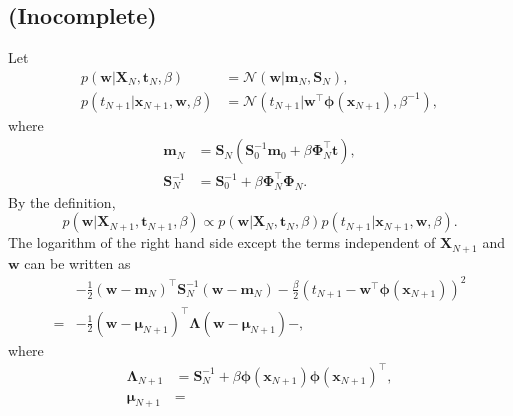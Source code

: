 \subsection{(Inocomplete)}
\label{3.8}
Let
%
\begin{equation}
\begin{aligned}
p(\mathbf{w} | \mathbf{X}_N, \mathbf{t}_N, \beta)
&=
\mathcal{N}
(\mathbf{w} | \mathbf{m}_N, \mathbf{S}_N),
\\
p(t_{N + 1} | \mathbf{x}_{N + 1}, \mathbf{w}, \beta)
&=
\mathcal{N}
\left(
	t_{N + 1}
	|
	\mathbf{w} ^ \intercal
	\bm{\phi}(\mathbf{x}_{N + 1}),
	\beta ^ {- 1}
\right),
\end{aligned}
\end{equation}
%
where
%
\begin{equation}
\begin{aligned}
\mathbf{m}_N
&=
\mathbf{S}_N
\left(
	\mathbf{S}_0 ^ {- 1}
	\mathbf{m}_0
	+
	\beta
	\bm{\Phi}_N ^ \intercal
	\mathbf{t}
\right),
\\
\mathbf{S}_N ^ {- 1}
&=
\mathbf{S}_0 ^ {- 1}
+
\beta
\bm{\Phi}_N ^ \intercal
\bm{\Phi}_N.
\end{aligned}
\end{equation}
%
By the definition,
%
\begin{equation}
p(\mathbf{w} | \mathbf{X}_{N + 1}, \mathbf{t}_{N + 1}, \beta)
\propto
p(\mathbf{w} | \mathbf{X}_N, \mathbf{t}_N, \beta)
p(t_{N + 1} | \mathbf{x}_{N + 1}, \mathbf{w}, \beta).
\end{equation}
%
The logarithm of the right hand side except the terms independent of $\mathbf{X}_{N + 1}$ and $\mathbf{w}$ can be written as
%
\begin{equation}
\begin{aligned}
&-
\frac{1}{2}
\left(
	\mathbf{w}
	-
	\mathbf{m}_N
\right) ^ \intercal
\mathbf{S}_N ^ {- 1}
\left(
	\mathbf{w}
	-
	\mathbf{m}_N
\right)
-
\frac{\beta}{2}
\left(
	t_{N + 1} 
	-
	\mathbf{w} ^ \intercal
	\bm{\phi}(\mathbf{x}_{N + 1}) 
\right) ^ 2
\\
=&
-
\frac{1}{2}
\left(
	\mathbf{w}
	-
	\bm{\mu}_{N + 1}
\right) ^ \intercal
\bm{\Lambda}
\left(
	\mathbf{w}
	-
	\bm{\mu}_{N + 1}
\right)
-
,
\end{aligned}
\end{equation}
%
where
%
\begin{equation}
\begin{aligned}
\bm{\Lambda}_{N + 1}
&=
\mathbf{S}_N ^ {- 1}
+
\beta
\bm{\phi}(\mathbf{x}_{N + 1})
\bm{\phi}(\mathbf{x}_{N + 1}) ^ \intercal,
\\
\bm{\mu}_{N + 1}
&=
\end{aligned}
\end{equation}
%
















